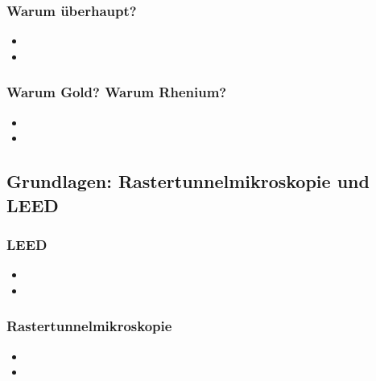 \documentclass{beamer}
\begin{document}
\begin{frame}
\frametitle{Warum überhaupt?}
\begin{itemize}
  \item
  \item
\end{itemize}
\end{frame}

\begin{frame}
\frametitle{Warum Gold? Warum Rhenium?}
\begin{itemize}
  \item
  \item
\end{itemize}
\end{frame}



\subsection[Grundlagen]{Grundlagen: Rastertunnelmikroskopie und LEED}

\begin{frame}
\frametitle{LEED}
\begin{itemize}
  \item
  \item
\end{itemize}
\end{frame}


\begin{frame}
\frametitle{Rastertunnelmikroskopie}
\begin{itemize}
  \item
  \item
\end{itemize}
\end{frame}

\end{document}
